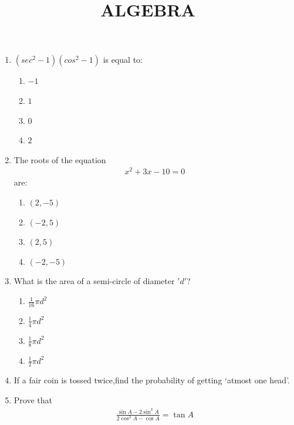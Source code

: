\documentclass{article}
\providecommand{\brak}[1]{\ensuremath{\left(#1\right)}}
\begin{document}
\begin{center}
\title{ALGEBRA}
\date{}
\maketitle
\end{center}
\begin{enumerate}
    \item $\brak{sec^2-1}\brak{cos^2-1}$ is equal to:
    \begin{enumerate}
    \item $-1$
    \item $1$
    \item $0$
    \item $2$
    \end{enumerate}

    \item The roots of the equation 
    \begin{align}
        x^2+3x-10=0
    \end{align}
    are:
    \begin{enumerate}
        \item $\brak{2,-5}$\\ \item $\brak{-2,5}$\\ \item $\brak{2,5}$\\  \item $\brak{-2,-5}$
    \end{enumerate}

    \item What is the area of a semi-circle of diameter $'d'$?
    
    \begin{enumerate}
        \item $\frac{1}{16}\pi d^2$\\ \item $\frac{1}{4}\pi d^2$\\ \item $\frac{1}{8}\pi d^2$\\ \item $\frac{1}{2}\pi d^2$
    \end{enumerate}


    \item If a fair coin is tossed twice,find the probability of getting `atmost one head'.

     \item Prove that 
    \begin{align}
        \frac{\sin A-2\sin^3 A}{2 \cos^3 A-\cos A}=\tan A
    \end{align}


\end{enumerate}
\end{document}
